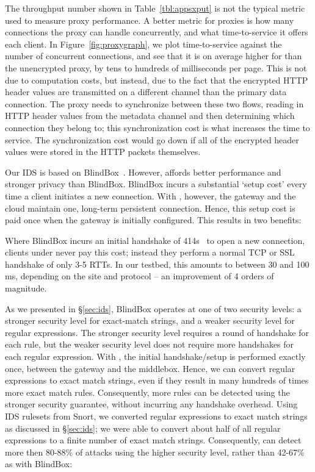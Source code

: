  The throughput number shown in Table~\ref{tbl:appsxput} is not the typical metric used to measure proxy performance. A better metric for proxies is how many connections the proxy can handle concurrently, and what time-to-service it offers each client. In Figure~\ref{fig:proxygraph}, we plot time-to-service against the number of concurrent connections, and see that it is on average higher for \sys than the unencrypted proxy, by tens to hundreds of milliseconds per page.
This is not due to computation costs, but instead, due to the fact that the encrypted HTTP header values are transmitted on a different channel than the primary data connection.
The \sys proxy needs to synchronize between these two flows, reading in HTTP header values from the metadata channel and then determining which connection they belong to; this synchronization cost is what increases the time to service. 
The synchronization cost would go down if all of the encrypted header values were stored in the HTTP packets themselves.


Our IDS is based on BlindBox~\cite{blindbox}. However, \sys affords better performance and stronger privacy than BlindBox. BlindBox incurs a substantial `setup cost' every time a client initiates a new connection. With \sys, however, the gateway and the cloud maintain one, long-term persistent connection. 
Hence, this setup cost is paid once when the gateway is initially configured. This results in two benefits:

 Where BlindBox incurs an initial handshake of 414s~\cite{blindbox} to open a new connection, clients under \sys never pay this cost; instead they perform a normal TCP or SSL handshake of only 3-5 RTTs. In our testbed, this amounts to between 30 and 100 ms, depending on the site and protocol -- an improvement of 4 orders of magnitude.

 As we presented in \S\ref{sec:ids}, BlindBox operates at one of two security levels: a stronger security level for exact-match strings, and a weaker security level for regular expressions. The stronger security level requires a round of handshake for each rule, but the weaker security level does not require more handshakes for each regular expression. 
With \sys, the initial handshake/setup is performed exactly once, between the gateway and the middlebox. 
Hence, we can convert regular expressions to exact match strings, even if they result in many hundreds of times more exact match rules. 
Consequently, more rules can be detected using the stronger security guarantee, without incurring any handshake overhead.
Using IDS rulesets from Snort, we converted regular expressions to exact match strings as discussed in \S\ref{sec:ids}; we were able to convert about half of all regular expressions to a finite number of exact match strings. 
Consequently, \sys can detect more then 80-88\% of attacks using the higher security level, rather than 42-67\% as with BlindBox:

